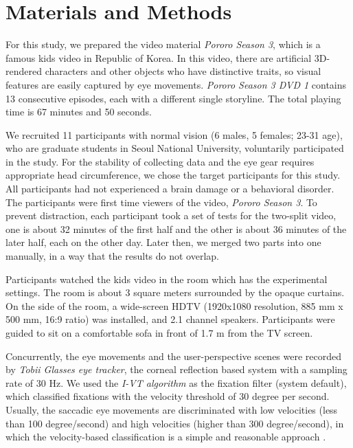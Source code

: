 \documentclass[10pt,letterpaper]{article}
\begin{document}
\section{Materials and Methods}
\label{sec:material-and-methods}

For this study, we prepared the video material \textit{Pororo Season 3}, which is a famous kids video in Republic of Korea. In this video, there are artificial 3D-rendered characters and other objects who have distinctive traits, so visual features are easily captured by eye movements. \textit{Pororo Season 3 DVD 1} contains 13 consecutive episodes, each with a different single storyline. The total playing time is 67 minutes and 50 seconds.

We recruited 11 participants with normal vision (6 males, 5 females; 23-31 age), who are graduate students in Seoul National University, voluntarily participated in the study. For the stability of collecting data and the eye gear requires appropriate head circumference, we chose the target participants for this study. All participants had not experienced a brain damage or a behavioral disorder. The participants were first time viewers of the video, \textit{Pororo Season 3}. To prevent distraction, each participant took a set of tests for the two-split video, one is about 32 minutes of the first half and the other is about 36 minutes of the later half, each on the other day. Later then, we merged two parts into one manually, in a way that the results do not overlap. 

Participants watched the kids video in the room which has the experimental settings. The room is about 3 square meters surrounded by the opaque curtains. On the side of the room, a wide-screen HDTV (1920x1080 resolution, 885 mm x 500 mm, 16:9 ratio) was installed, and 2.1 channel speakers. Participants were guided to sit on a comfortable sofa in front of 1.7 m from the TV screen.

Concurrently, the eye movements and the user-perspective scenes were recorded by \textit{Tobii Glasses eye tracker}, the corneal reflection based system with a sampling rate of 30 Hz. We used the \textit{I-VT algorithm} as the fixation filter (system default), which classified fixations with the velocity threshold of 30 degree per second. Usually, the saccadic eye movements are discriminated with low velocities (less than 100 degree/second) and high velocities (higher than 300 degree/second), in which the velocity-based classification is a simple and reasonable approach \cite{Salvucci2000}.
\end{document}
